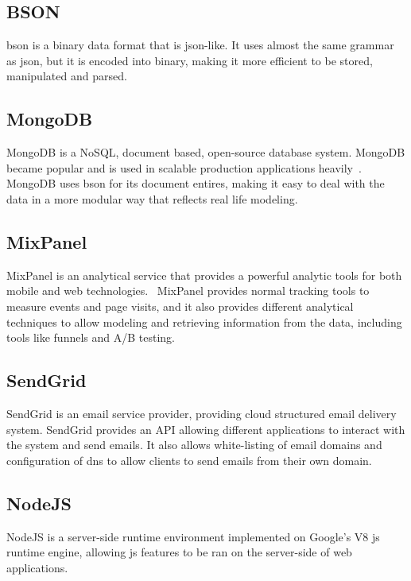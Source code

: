 \subsection{BSON}
\label{sub:bson}
\ac{bson} is a binary data format that is \ac{json}-like. It uses almost the same grammar as \ac{json}, but it
is encoded into binary, making it more efficient to be stored, manipulated and parsed.~\cite{bson}

\subsection{MongoDB\texttrademark{}}
\label{sub:mongodb}
MongoDB\texttrademark{} is a NoSQL, document based, open-source database system. MongoDB\texttrademark{} became popular and is used in
scalable production applications heavily~\cite{dbs_rank}. MongoDB\texttrademark{} uses \ac{bson} for its document entires, making
it easy to deal with the data in a more modular way that reflects real life modeling.

\subsection{MixPanel\texttrademark{}}
\label{sub:mixpanel}
MixPanel\texttrademark{} is an analytical service that provides a powerful analytic tools for both mobile and web technologies.~\cite{mixpanel}
MixPanel\texttrademark{} provides normal tracking tools to measure events and page visits, and it also provides different analytical
techniques to allow modeling and retrieving information from the data, including tools like funnels and A/B testing.~\cite{mixpanel}

\subsection{SendGrid\texttrademark{}}
\label{sub:sendgrid}
SendGrid\texttrademark{} is an email service provider, providing cloud structured email delivery system. SendGrid\texttrademark{} provides
an API allowing different applications to interact with the system and send emails. It also allows white-listing of email domains and configuration of
\ac{dns} to allow clients to send emails from their own domain.~\cite{sendgrid}

\subsection{NodeJS}
\label{sub:node}
NodeJS is a server-side runtime environment implemented on Google's V8 \ac{js} runtime engine, allowing \ac{js} features to be ran
on the server-side of web applications.~\cite{nodejs}

